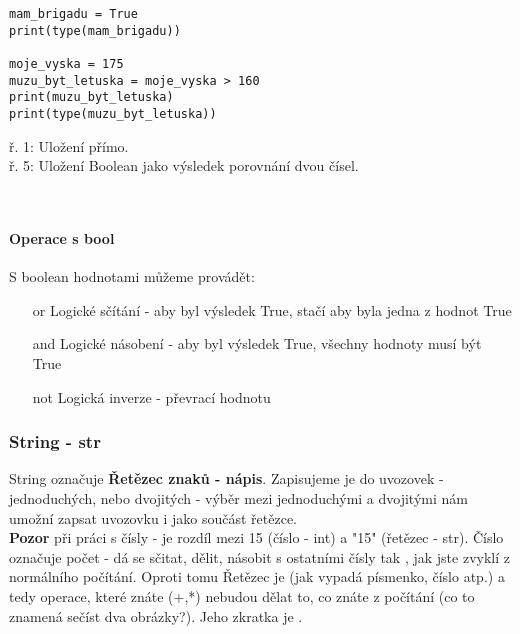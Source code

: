 \begin{minipage}[t]{.45\textwidth}
\begin{code}
\begin{verbatim}
mam_brigadu = True
print(type(mam_brigadu))

moje_vyska = 175
muzu_byt_letuska = moje_vyska > 160
print(muzu_byt_letuska)
print(type(muzu_byt_letuska))
\end{verbatim}

\label{code:typy_bool}
\end{code}
\end{minipage}
\begin{minipage}[t]{.45\textwidth}
\vspace{2.5cm}
ř. 1:	Uložení  přímo.\\
ř. 5:	Uložení Boolean jako výsledek porovnání dvou čísel.
\end{minipage}\\ 

\paragraph{Operace s bool}
S boolean hodnotami můžeme provádět:
\begin{enumerate}
\item[or] Logické sčítání - aby byl výsledek True, stačí aby byla jedna z hodnot True
\item[and] Logické násobení - aby byl výsledek True, všechny hodnoty musí být True
\item[not] Logická inverze - převrací hodnotu
\end{enumerate}

\subsubsection{String - str}
String označuje \textbf{Řetězec znaků - nápis}. Zapisujeme je do uvozovek - jednoduchých, nebo dvojitých - výběr mezi jednoduchými a dvojitými nám umožní zapsat uvozovku i jako součást řetězce.\\
\textbf{Pozor} při práci s čísly - je rozdíl mezi 15 (číslo - int) a "15" (řetězec - str). Číslo označuje počet - dá se sčitat, dělit, násobit s ostatními čísly tak , jak jste zvyklí z normálního počítání. Oproti tomu Řetězec je  (jak vypadá písmenko, číslo atp.) a tedy operace, které znáte (+,*) nebudou dělat to, co znáte z počítání (co to znamená sečíst dva obrázky?).
Jeho zkratka je .\\

